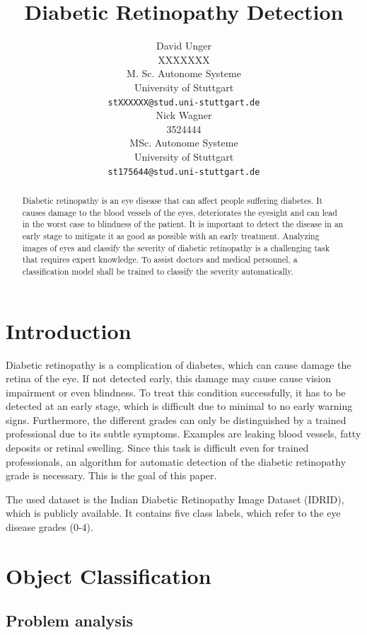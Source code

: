 \documentclass{article}
\title{Diabetic Retinopathy Detection}
\author{
  David Unger\\
  XXXXXXX \\
  M. Sc. Autonome Systeme\\
  University of Stuttgart\\
  \texttt{stXXXXXX@stud.uni-stuttgart.de} \\
  \And
  Nick Wagner\\
  3524444 \\
  MSc. Autonome Systeme\\
  University of Stuttgart\\
  \texttt{st175644@stud.uni-stuttgart.de} \\
}
\begin{document}
\maketitle

\begin{abstract}
Diabetic retinopathy is an eye disease that can affect people suffering diabetes. It causes damage to the blood vessels of 
the eyes, deteriorates the eyesight and can lead in the worst case to blindness of the patient. It is important to 
detect the disease in an early stage to mitigate it as good as possible with an early treatment. Analyzing images of 
eyes and classify the severity of diabetic retinopathy is a challenging task that requires expert knowledge. To assist 
doctors and medical personnel, a classification model shall be trained to classify the severity automatically. 
\end{abstract}

\section{Introduction}
Diabetic retinopathy is a complication of diabetes, which can cause damage the retina of the eye. 
If not detected early, this damage may cause cause vision impairment or even blindness. 
To treat this condition successfully, it has to be detected at an early stage, which is difficult due to minimal to no early warning signs. 
Furthermore, the different grades can only be distinguished by a trained professional due to its subtle symptoms.
Examples are leaking blood vessels, fatty deposits or retinal swelling.
Since this task is difficult even for trained professionals, an algorithm for automatic detection of the diabetic retinopathy grade is necessary.
This is the goal of this paper. 

The used dataset is the Indian Diabetic Retinopathy Image Dataset (IDRID), which is publicly available. It contains five class labels, which refer to 
the eye disease grades (0-4).

\section{Object Classification}
\subsection{Problem analysis}
\end{document}
